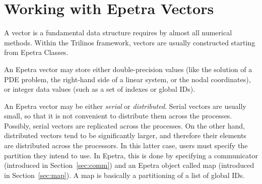 % 
% 
% 
%  
%  
% 

\section{Working with Epetra Vectors}
\label{chap:epetra_vec}

A vector is a fundamental data structure requires by almost all
numerical methods. Within the Trilinos framework, vectors are usually
constructed starting from Epetra Classes.

An Epetra vector may store either double-precision values (like the
solution of a PDE problem, the right-hand side of a linear system, or
the nodal coordinates), or integer data values (such as a set of indexes
or global IDs).

An Epetra vector may be either {\em serial} or {\em distributed}. Serial
vectors are usually small, so that it is not convenient to distribute
them across the processes. Possibly, serial vectors are replicated
across the processes. On the other hand, distributed vectors tend to be
significantly larger, and therefore their elements are distributed
across the processors. In this latter case, users must specify the
partition they intend to use.  In Epetra, this is done by specifying a
communicator (introduced in Section~\ref{sec:comm}) and an Epetra object
called map (introduced in Section~\ref{sec:map}). A map is basically a
partitioning of a list of global IDs.

